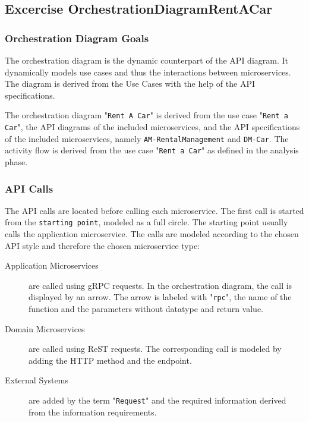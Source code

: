 \subsection{Excercise OrchestrationDiagramRentACar}
\subsubsection*{Orchestration Diagram Goals}
The orchestration diagram is the dynamic counterpart of the API diagram.
It dynamically models use cases and thus the interactions between microservices.
The diagram is derived from the Use Cases with the help of the API specifications.

The orchestration diagram "\texttt{Rent A Car}" is derived from the use case "\texttt{Rent a Car}", the API diagrams of the included microservices, and the API specifications of the included microservices, namely \texttt{AM-RentalManagement} and \texttt{DM-Car}.
The activity flow is derived from the use case "\texttt{Rent a Car}" as defined in the analysis phase.

\subsubsection*{API Calls}
The API calls are located before calling each microservice.
The first call is started from the \texttt{starting point}, modeled as a full circle.
The starting point usually calls the application microservice.
The calls are modeled according to the chosen API style and therefore the chosen microservice type:
\begin{description}
    \item[Application Microservices] are called using gRPC requests.
        In the orchestration diagram, the call is displayed by an arrow.
        The arrow is labeled with "\texttt{rpc}", the name of the function and the parameters without datatype and return value. 
    \item[Domain Microservices] are called using ReST requests.
        The corresponding call is modeled by adding the HTTP method and the endpoint.
    \item[External Systems] are added by the term "\texttt{Request}" and the required information derived from the information requirements.
\end{description}


